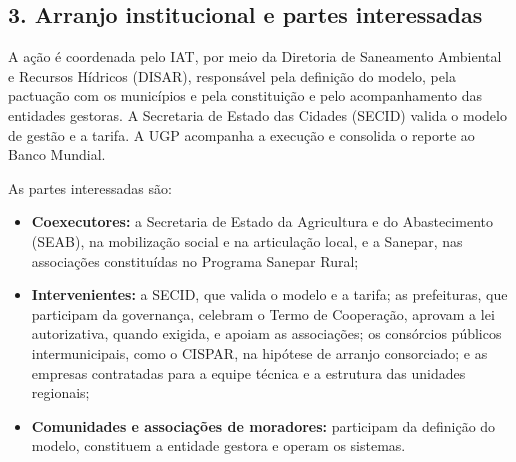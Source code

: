 

{}
\subsection*{3. Arranjo institucional e partes interessadas}

A ação é coordenada pelo IAT, por meio da Diretoria de Saneamento Ambiental e Recursos Hídricos (DISAR), responsável pela definição do modelo, pela pactuação com os municípios e pela constituição e pelo acompanhamento das entidades gestoras. A Secretaria de Estado das Cidades (SECID) valida o modelo de gestão e a tarifa. A UGP acompanha a execução e consolida o reporte ao Banco Mundial.


As partes interessadas são:

\begin{itemize}
  \item \textbf{Coexecutores:} a Secretaria de Estado da Agricultura e do Abastecimento (SEAB), na mobilização social e na articulação local, e a Sanepar, nas associações constituídas no Programa Sanepar Rural;
  \item \textbf{Intervenientes:} a SECID, que valida o modelo e a tarifa; as prefeituras, que participam da governança, celebram o Termo de Cooperação, aprovam a lei autorizativa, quando exigida, e apoiam as associações; os consórcios públicos intermunicipais, como o CISPAR, na hipótese de arranjo consorciado; e as empresas contratadas para a equipe técnica e a estrutura das unidades regionais;
  \item \textbf{Comunidades e associações de moradores:} participam da definição do modelo, constituem a entidade gestora e operam os sistemas.
\end{itemize}

